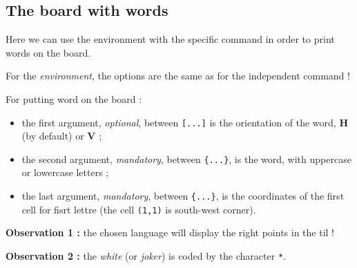 \documentclass{article}
\newcommand\Cle[1]{{\bfseries\sffamily\textlangle #1\textrangle}}
\begin{document}
\newpage

\subsection{The board with words}

Here we can use the \textsf{environment} with the specific \textsf{command} in order to print words on the board.

\smallskip

For the \textit{environment}, the options are the same as for the independent \textsf{command} !

\smallskip

For putting word on the board :

\begin{itemize}
	\item the first argument, \textit{optional}, between \texttt{[...]} is the orientation of the word, \Cle{H} (by default) or \Cle{V} ;
	\item the second argument, \textit{mandatory}, between \texttt{\{...\}}, is the word, with uppercase or lowercase letters ;
	\item the last argument, \textit{mandatory}, between \texttt{\{...\}}, is the coordinates of the first cell for fisrt lettre (the cell \texttt{(1,1)} is south-west corner).
\end{itemize}

\textbf{Observation 1 :} the chosen language will display the right points in the til !

\smallskip

\textbf{Observation 2 :} the \textit{white} (or \textit{joker}) is coded by the character \texttt{*}.

\begin{PresentationCode}{}
\begin{EnvScrabble}[Scale=0.75,Labels=false,Help]
\end{EnvScrabble}
\end{PresentationCode}
\end{document}
